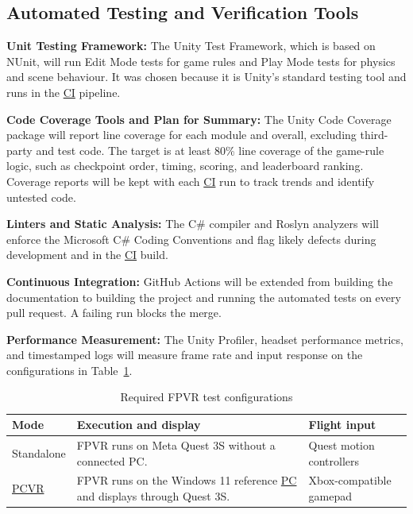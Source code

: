 \documentclass[12pt, titlepage]{article}
\begin{document}
\subsection{Automated Testing and Verification Tools}

\textbf{Unit Testing Framework:} The Unity Test Framework, which is based on NUnit, will
run Edit Mode tests for game rules and Play Mode tests for physics and scene behaviour.
It was chosen because it is Unity's standard testing tool and runs in the \hyperlink{abbr:CI}{CI} pipeline.

\textbf{Code Coverage Tools and Plan for Summary:} The Unity Code Coverage package will
report line coverage for each module and overall, excluding third-party and test code.
The target is at least 80\% line coverage of the game-rule logic, such as checkpoint
order, timing, scoring, and leaderboard ranking. Coverage reports will be kept with each
\hyperlink{abbr:CI}{CI} run to track trends and identify untested code.

\textbf{Linters and Static Analysis:} The C\# compiler and Roslyn analyzers will enforce
the Microsoft C\# Coding Conventions and flag likely defects during development and in
the \hyperlink{abbr:CI}{CI} build.

\textbf{Continuous Integration:} GitHub Actions will be extended from building the
documentation to building the project and running the automated tests on every pull
request. A failing run blocks the merge.

\textbf{Performance Measurement:} The Unity Profiler, headset performance metrics, and
timestamped logs will measure frame rate and input response on the configurations in
Table~\ref{tab:vnv-configurations}.

\begin{table}[!htbp]
\centering
\caption{Required FPVR test configurations}
\label{tab:vnv-configurations}
\renewcommand{\arraystretch}{1.15}
\begin{tabularx}{\textwidth}{@{}>{\raggedright\arraybackslash}p{}>{\raggedright\arraybackslash}X>{\raggedright\arraybackslash}p{}@{}}
\toprule
\textbf{Mode} &
\textbf{Execution and display} &
\textbf{Flight input} \\
\midrule
Standalone &
FPVR runs on Meta Quest 3S without a connected PC. &
Quest motion controllers \\
\hyperlink{abbr:PCVR}{PCVR} &
FPVR runs on the Windows 11 reference \hyperlink{abbr:PC}{PC} and displays through Quest 3S. &
Xbox-compatible gamepad \\
\bottomrule
\end{tabularx}
\end{table}
\end{document}
